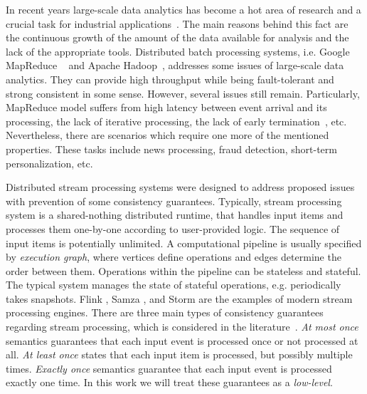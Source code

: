 
\label {fs-phd-intro}

In recent years large-scale data analytics has become a hot area of research and a crucial task for industrial applications~\cite{Zou:2010:SRQ:1920841.1921012}. The main reasons behind this fact are the continuous growth of the amount of the data available for analysis and the lack of the appropriate tools. Distributed batch processing systems, i.e. Google MapReduce ~\cite{Dean:2008:MSD:1327452.1327492} and Apache Hadoop~\cite{hadoop2009hadoop}, addresses some issues of large-scale data analytics. They can provide high throughput while being fault-tolerant and strong consistent in some sense. However, several issues still remain. Particularly, MapReduce model suffers from high latency between event arrival and its processing, the lack of iterative processing, the lack of early termination~\cite{Doulkeridis:2014:SLA:2628707.2628782}, etc. Nevertheless, there are scenarios which require one more of the mentioned properties. These tasks include news processing, fraud detection, short-term personalization, etc.

Distributed stream processing systems were designed to address proposed issues with prevention of some consistency guarantees. Typically, stream processing system is a shared-nothing distributed runtime, that handles input items and processes them one-by-one according to user-provided logic. The sequence of input items is potentially unlimited. A computational pipeline is usually specified by {\em execution graph}, where vertices define operations and edges determine the order between them. Operations within the pipeline can be stateless and stateful. The typical system manages the state of stateful operations, e.g. periodically takes snapshots. Flink \cite{carbone2015apache}, Samza \cite{Noghabi:2017:SSS:3137765.3137770}, and Storm \cite{apache:storm} are the examples of modern stream processing engines. There are three main types of consistency guarantees regarding stream processing, which is considered in the literature~\cite{Kulkarni:2015:THS:2723372.2742788, Akidau:2013:MFS:2536222.2536229, Carbone:2017:SMA:3137765.3137777}. {\em At most once} semantics guarantees that each input event is processed once or not processed at all. {\em At least once} states that each input item is processed, but possibly multiple times. {\em Exactly once} semantics guarantee that each input event is processed exactly one time. In this work we will treat these guarantees as a {\em low-level}. 

